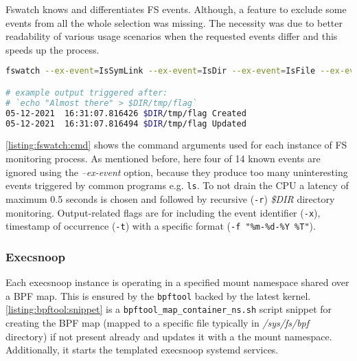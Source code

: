Fswatch knows and differentiates FS events. Although, a feature to exclude some events from all the whole selection was missing. The necessity was due to better readability of various usage scenarios when the requested events differ and this speeds up the process.

\begin{lstlisting}[language=bash, style=custom, caption={}, label=listing:fswatch:cmd]
fswatch --ex-event=IsSymLink --ex-event=IsDir --ex-event=IsFile --ex-event=PlatformSpecific -l 0.5 -r -x -t -f "%m-%d-%Y  %T" $DIR

# example output triggered after:
# `echo "Almost there" > $DIR/tmp/flag`
05-12-2021  16:31:07.816426 $DIR/tmp/flag Created
05-12-2021  16:31:07.816494 $DIR/tmp/flag Updated
\end{lstlisting}
\autoref{listing:fswatch:cmd} shows the command arguments used for each instance of FS monitoring process. As mentioned before, here four of 14 known events are ignored using the \textit{--ex-event} option, because they produce too many uninteresting events triggered by common programs e.g. \texttt{ls}. To not drain the CPU a latency of maximum 0.5 seconds is chosen and followed by recursive (\texttt{-r}) \textit{\$DIR} directory monitoring. Output-related flags are for including the event identifier (\texttt{-x}), timestamp of occurrence (\texttt{-t}) with a specific format (\texttt{-f "\%m-\%d-\%Y  \%T"}).

\subsubsection*{Execsnoop}
Each execsnoop instance is operating in a specified mount namespace shared over a BPF map. This is ensured by the \texttt{bpftool} backed by the latest kernel. \autoref{listing:bpftool:snippet} is a \texttt{bpftool\_map\_container\_ns.sh} script snippet for creating the BPF map (mapped to a specific file typically in \textit{/sys/fs/bpf} directory) if not present already and updates it with a the mount namespace. Additionally, it starts the templated execsnoop systemd services.

